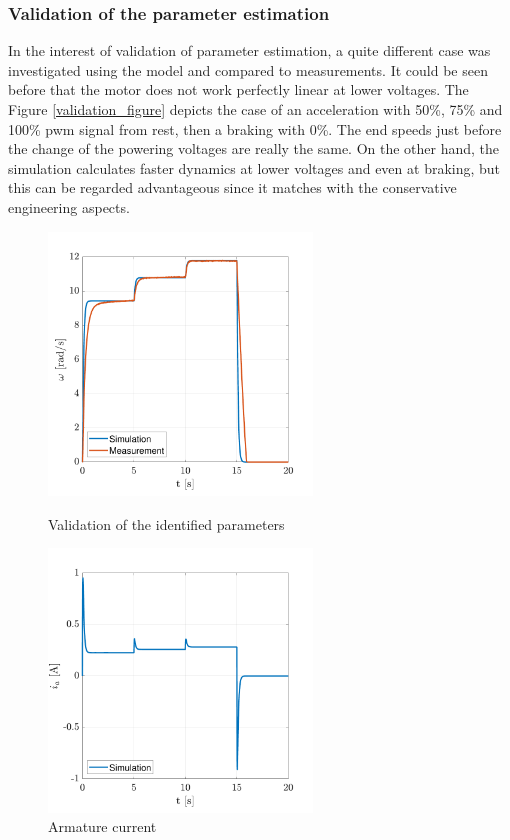 \documentclass[12pt,english]{article}
\begin{document}
\subsubsection{Validation of the parameter estimation}
In the interest of validation of parameter estimation, a quite different case was investigated using the model and compared to measurements. It could be seen before that the motor does not work perfectly linear at lower voltages. The Figure \ref{validation_figure} depicts the case of an acceleration with 50\%, 75\% and 100\% pwm signal from rest, then a braking with  0\%. The end speeds just before the change of the powering voltages are really the same. On the other hand, the simulation calculates faster dynamics at lower voltages and even at braking, but this can be regarded advantageous since it matches with the conservative engineering aspects.

 \begin{figure}[htb!]
	\centering
	\includegraphics[height=7cm]{figures/validation_figure}
	\caption{Validation of the identified parameters}
	\label{validation_figure}
	\endminipage\hfill
	\centering
	\includegraphics[height=7cm]{figures/validation_figure_current}
	\caption{Armature current}
	\label{validation_figure_current}
	\endminipage\hfill
\end{figure}
\end{document}
